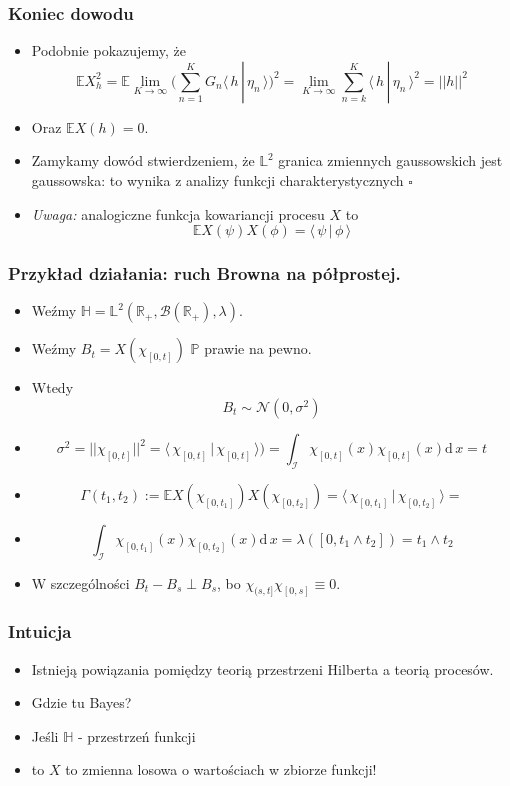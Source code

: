 \documentclass[draft, xetex]{beamer}
\newcommand{\HI}[2]{\langle \,#1 \,|\, #2\, \rangle}
\begin{document}
\begin{frame}
	\frametitle{Koniec dowodu}
		\begin{itemize}
			\item Podobnie pokazujemy, że $$\mathbb{E} X_h^2 = \mathbb{E} \lim_{K \rightarrow \infty}\Big(\sum_{n = 1}^{K} G_n \HI{h}{\eta_n} \Big)^2 = \lim_{K \rightarrow \infty} \sum_{n=k}^K \HI{h}{\eta_n}^2 = ||h||^2$$
			\item Oraz $\mathbb{E} X(h) = 0$.
			\item Zamykamy dowód stwierdzeniem, że $\mathbb{L}^2$ granica zmiennych gaussowskich jest gaussowska: to wynika z analizy funkcji charakterystycznych $\square$
			\item \emph{Uwaga:} analogiczne funkcja kowariancji procesu $X$ to $$\mathbb{E}X(\psi)X(\phi) = \HI{\psi}{\phi}$$
		\end{itemize}
\end{frame}

\begin{frame}
	\frametitle{Przykład działania: ruch Browna na półprostej.}
	
		\begin{itemize}
			\item Weźmy $\mathbb{H} = \mathbb{L}^2(\mathbb{R}_+, \mathcal{B}(\mathbb{R}_+), \lambda)$.	
			\item Weźmy $B_t = X(\chi_{[0,t]})$ $\mathbb{P}$ prawie na pewno.
			\item Wtedy $$B_t \sim \mathcal{N}(0, \sigma^2)$$
			\item $$\sigma^2 = ||\chi_{[0,t]}||^2 = \HI{\chi_{[0,t]}}{\chi_{[0,t]}}) =  \int_{\mathcal{I}} \chi_{[0,t]}(x) \chi_{[0,t]}(x)\mathrm{d}\,x = t$$
			\item $$\Gamma(t_1, t_2) := \mathbb{E}X(\chi_{[0,t_1]})X(\chi_{[0,t_2]}) = \HI{\chi_{[0,t_1]}}{\chi_{[0,t_2]}} =  $$	
			\item $$\int_{\mathcal{I}} \chi_{[0,t_1]}(x) \chi_{[0,t_2]}(x)\mathrm{d}\,x = \lambda([0, t_1 \wedge t_2]) = t_1 \wedge t_2$$
			\item W szczególności $B_t - B_s \perp B_s$, bo $\chi_{(s, t]}\chi_{[0,s]} \equiv 0$.
		\end{itemize}	

\end{frame}

\begin{frame}
	\frametitle{Intuicja}
	
	\begin{itemize}
		\item Istnieją powiązania pomiędzy teorią przestrzeni Hilberta a teorią procesów.
		\item Gdzie tu Bayes?
		\item Jeśli $\mathbb{H}$ - przestrzeń funkcji
		\item to $X$ to zmienna losowa o wartościach w zbiorze funkcji!
	\end{itemize}
\end{frame}
\end{document}
